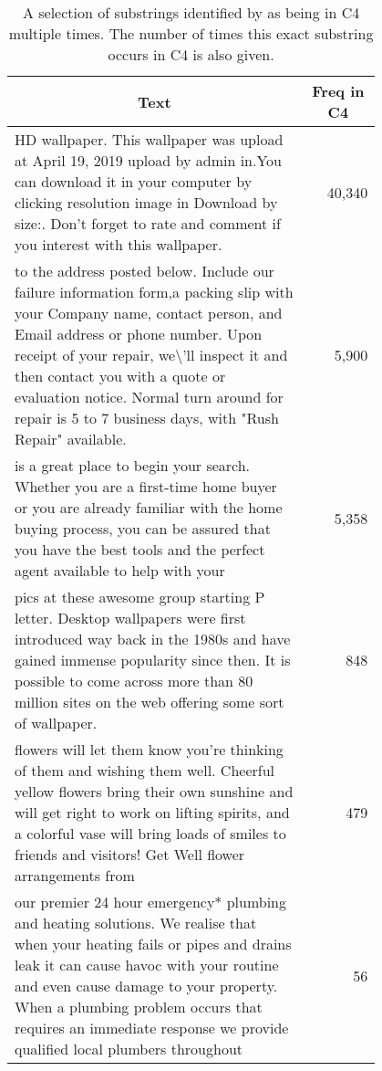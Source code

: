 \begin{table*}[h]
  \centering
  \caption{A selection of substrings identified by \Exact{} as being in C4 multiple times. The number of times this exact substring occurs in C4 is also given.}
  \small
    \begin{tabular}{p{0.8\linewidth}|r}
    \toprule
    \multicolumn{1}{c|}{\textbf{Text}}  & \multicolumn{1}{c}{\textbf{Freq in C4}} \\
    \midrule
    HD wallpaper. This wallpaper was upload at April 19, 2019 upload by admin in.You can download it in your computer by clicking resolution image in Download by size:. Don't forget to rate and comment if you interest with this wallpaper. &            40,340  \\
    \hline
    to the address posted below. Include our failure information form,a packing slip with your Company name, contact person, and Email address or phone number. Upon receipt of your repair, we\textbackslash{}'ll inspect it and then contact you with a quote or evaluation notice. Normal turn aro\newline{}und for repair is 5 to 7 business days, with "Rush Repair" available. &              5,900  \\
    \hline
    is a great place to begin your search. Whether you are a first-time home buyer or you are already familiar with the home buying process, you can be assured that you have the best tools and the perfect agent available to help with your &              5,358  \\
    \hline
    pics at these awesome group starting P letter. Desktop wallpapers were first introduced way back in the 1980s and have gained immense popularity since then. It is possible to come across more than 80 million sites on the web offering some sort of wallpaper. &                 848  \\
    \hline
    flowers will let them know you're thinking of them and wishing them well. Cheerful yellow flowers bring their own sunshine and will get right to work on lifting spirits, and a colorful vase will bring loads of smiles to friends and visitors! Get Well flower arrangements from &                 479  \\
    \hline
    our premier 24 hour emergency* plumbing and heating solutions. We realise that when your heating fails or pipes and drains leak it can cause havoc with your routine and even cause damage to your property. When a plumbing problem occurs that requires an immediate response we provide qualified local plumbers throughout &                   56  \\

\end{tabular}
\end{table*}
